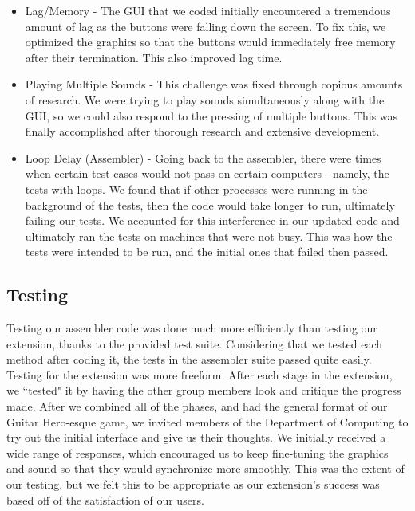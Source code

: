 \documentclass[11pt]{article}
\begin{document}
\begin{itemize}
\item Lag/Memory - The GUI that we coded initially encountered a tremendous amount of lag as the buttons were falling down the screen. To fix this, we optimized the graphics so that the buttons would immediately free memory after their termination. This also improved lag time.

\item Playing Multiple Sounds - This challenge was fixed through copious amounts of research. We were trying to play sounds simultaneously along with the GUI, so we could also respond to the pressing of multiple buttons. This was finally accomplished after thorough research and extensive development.

\item Loop Delay (Assembler) - Going back to the assembler, there were times when certain test cases would not pass on certain computers - namely, the tests with loops. We found that if other processes were running in the background of the tests, then the code would take longer to run, ultimately failing our tests. We accounted for this interference in our updated code and ultimately ran the tests on machines that were not busy. This was how the tests were intended to be run, and the initial ones that failed then passed. 

\end{itemize}

\subsection{Testing}

Testing our assembler code was done much more efficiently than testing our extension, thanks to the provided test suite. Considering that we tested each method after coding it, the tests in the assembler suite passed quite easily. Testing for the extension was more freeform. After each stage in the extension, we ``tested" it by having the other group members look and critique the progress made. After we combined all of the phases, and had the general format of our Guitar Hero-esque game, we invited members of the Department of Computing to try out the initial interface and give us their thoughts. We initially received a wide range of responses, which encouraged us to keep fine-tuning the graphics and sound so that they would synchronize more smoothly. This was the extent of our testing, but we felt this to be appropriate as our extension's success was based off of the satisfaction of our users.
\end{document}
